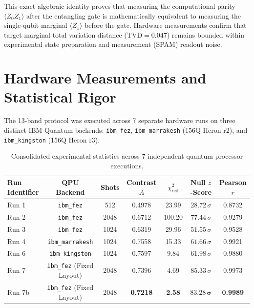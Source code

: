 \documentclass[11pt,a4paper]{article}
\begin{document}
This exact algebraic identity proves that measuring the computational parity $\langle Z_0 Z_1 \rangle$ after the entangling gate is mathematically equivalent to measuring the single-qubit marginal $\langle Z_1 \rangle$ before the gate. Hardware measurements confirm that target marginal total variation distance ($\text{TVD} = 0.047$) remains bounded within experimental state preparation and measurement (SPAM) readout noise.

\section{Hardware Measurements and Statistical Rigor}
The 13-band protocol was executed across 7 separate hardware runs on three distinct IBM Quantum backends: \texttt{ibm\_fez}, \texttt{ibm\_marrakesh} (156Q Heron r2), and \texttt{ibm\_kingston} (156Q Heron r3).

\begin{table}[htbp]
\centering
\begin{tabular}{lcccccc}
\toprule
\textbf{Run Identifier} & \textbf{QPU Backend} & \textbf{Shots} & \textbf{Contrast $A$} & \textbf{$\chi^2_{\text{red}}$} & \textbf{Null $z$-Score} & \textbf{Pearson $r$} \\
\midrule
Run 1 & \texttt{ibm\_fez} & 512 & 0.4978 & 23.99 & $28.72\,\sigma$ & 0.8732 \\
Run 2 & \texttt{ibm\_fez} & 2048 & 0.6712 & 100.20 & $77.44\,\sigma$ & 0.9279 \\
Run 3 & \texttt{ibm\_fez} & 1024 & 0.6319 & 29.96 & $51.55\,\sigma$ & 0.9528 \\
Run 4 & \texttt{ibm\_marrakesh} & 1024 & 0.7558 & 15.33 & $61.66\,\sigma$ & 0.9921 \\
Run 6 & \texttt{ibm\_kingston} & 1024 & 0.7597 & 9.84 & $61.98\,\sigma$ & 0.9880 \\
Run 7 & \texttt{ibm\_fez} (Fixed Layout) & 2048 & 0.7396 & 4.69 & $85.33\,\sigma$ & 0.9973 \\
Run 7b & \texttt{ibm\_fez} (Fixed Layout) & 2048 & \textbf{0.7218} & \textbf{2.58} & $\mathbf{83.28\,\sigma}$ & \textbf{0.9989} \\
\bottomrule
\end{tabular}
\caption{Consolidated experimental statistics across 7 independent quantum processor executions.}
\label{tab:wave_stats}
\end{table}
\end{document}
